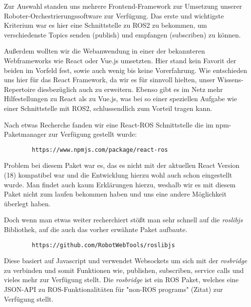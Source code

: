 \begin{flushleft}


    
    Zur Auswahl standen uns mehrere Frontend-Framework zur Umsetzung unserer Roboter-Orchestrierungssoftware zur Verfügung. Das erste und wichtigste Kriterium war es hier eine Schnittstelle zu ROS2 zu bekommen, um verschiedenste Topics senden (publish) und empfangen (subscriben) zu können. 

    Außerdem wollten wir die Webanwendung in einer der bekannteren Webframeworks wie React oder Vue.js umsetzten. Hier stand kein Favorit der beiden im Vorfeld fest, sowie auch wenig bis keine Vorerfahrung. Wie entschieden uns hier für das React Framework, da wir es für sinnvoll hielten, unser Wissens-Repertoire diesbezüglich auch zu erweitern. Ebenso gibt es im Netz mehr Hilfestellungen zu React als zu Vue.js, was bei so einer speziellen Aufgabe wie einer Schnittstelle mit ROS2, schlussendlich zum Vorteil tragen kann. 

    Nach etwas Recherche fanden wir eine React-ROS Schnittstelle die im npm-Paketmanager zur Verfügung gestellt wurde:
    \begin{lstlisting}
        https://www.npmjs.com/package/react-ros 
    \end{lstlisting}

    Problem bei diesem Paket war es, das es nicht mit der aktuellen React Version (18) kompatibel war und die Entwicklung hierzu wohl auch schon eingestellt wurde. Man findet auch kaum Erklärungen hierzu, weshalb wir es mit diesem Paket nicht zum laufen bekommen haben und uns eine andere Möglichkeit überlegt haben.

    Doch wenn man etwas weiter recherchiert stößt man sehr schnell auf die \textit{roslibjs} Bibliothek, auf die auch das vorher erwähnte Paket aufbaute. 
    \begin{lstlisting}
        https://github.com/RobotWebTools/roslibjs 
    \end{lstlisting}
    
    Diese basiert auf Javascript und verwendet Websockets um sich mit der \textit{rosbridge} zu verbinden und somit Funktionen wie, publishen, subscriben, service calls und vieles mehr zur Verfügung stellt. Die \textit{rosbridge} ist ein ROS Paket, welches eine JSON-API zu ROS-Funktionalitäten für "non-ROS programs" (Zitat) zur Verfügung stellt.


\end{flushleft}

